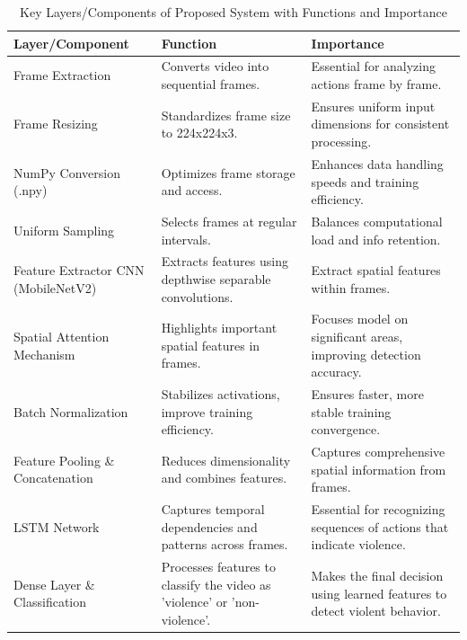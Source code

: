 \begin{table}[!htbp]
\centering
\caption[Key Components of Proposed System]{Key Layers/Components of Proposed System with Functions and Importance}
\begin{tabular}{|>{\raggedright\arraybackslash}m{4cm}|>{\raggedright\arraybackslash}m{5cm}|>{\raggedright\arraybackslash}m{5cm}|}
\hline
\textbf{Layer/Component} & \textbf{Function} & \textbf{Importance} \\ \hline
Frame Extraction & Converts video into sequential frames. & Essential for analyzing actions frame by frame. \\ \hline
Frame Resizing & Standardizes frame size to 224x224x3. & Ensures uniform input dimensions for consistent processing. \\ \hline
NumPy Conversion (.npy) & Optimizes frame storage and access. & Enhances data handling speeds and training efficiency. \\ \hline
Uniform Sampling & Selects frames at regular intervals. & Balances computational load and info retention. \\ \hline
Feature Extractor CNN (MobileNetV2) & Extracts features using depthwise separable convolutions. & Extract spatial features within frames. \\ \hline
Spatial Attention Mechanism & Highlights important spatial features in frames. & Focuses model on significant areas, improving detection accuracy. \\ \hline
Batch Normalization & Stabilizes activations, improve training efficiency. & Ensures faster, more stable training convergence. \\ \hline
Feature Pooling \& Concatenation & Reduces dimensionality and combines features. & Captures comprehensive spatial information from frames. \\ \hline
LSTM Network & Captures temporal dependencies and patterns across frames. & Essential for recognizing sequences of actions that indicate violence. \\ \hline
Dense Layer \& Classification & Processes features to classify the video as 'violence' or 'non-violence'. & Makes the final decision using learned features to detect violent behavior. \\ \hline
\end{tabular}
\label{propsysfunc}
\end{table}

\clearpage

